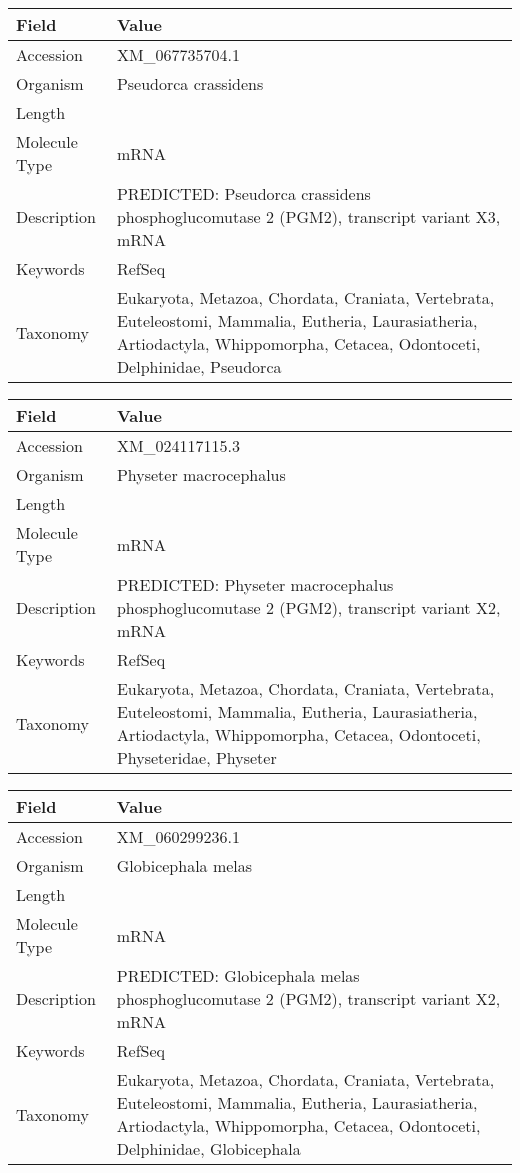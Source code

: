 \documentclass[10pt]{article}
\begin{document}
{\footnotesize
\begin{longtable}{>{\raggedright\arraybackslash}p{4.5cm} >{\raggedright\arraybackslash}p{11.5cm}}
\textbf{Field} & \textbf{Value} \\
\hline
Accession & XM\_067735704.1 \\
Organism & Pseudorca crassidens \\
Length & 12477 \\
Molecule Type & mRNA \\
Description & PREDICTED: Pseudorca crassidens phosphoglucomutase 2 (PGM2), transcript variant X3, mRNA \\
Keywords & RefSeq \\
Taxonomy & Eukaryota, Metazoa, Chordata, Craniata, Vertebrata, Euteleostomi, Mammalia, Eutheria, Laurasiatheria, Artiodactyla, Whippomorpha, Cetacea, Odontoceti, Delphinidae, Pseudorca \\
\end{longtable}
}

{\footnotesize
\begin{longtable}{>{\raggedright\arraybackslash}p{4.5cm} >{\raggedright\arraybackslash}p{11.5cm}}
\textbf{Field} & \textbf{Value} \\
\hline
Accession & XM\_024117115.3 \\
Organism & Physeter macrocephalus \\
Length & 2024 \\
Molecule Type & mRNA \\
Description & PREDICTED: Physeter macrocephalus phosphoglucomutase 2 (PGM2), transcript variant X2, mRNA \\
Keywords & RefSeq \\
Taxonomy & Eukaryota, Metazoa, Chordata, Craniata, Vertebrata, Euteleostomi, Mammalia, Eutheria, Laurasiatheria, Artiodactyla, Whippomorpha, Cetacea, Odontoceti, Physeteridae, Physeter \\
\end{longtable}
}

{\footnotesize
\begin{longtable}{>{\raggedright\arraybackslash}p{4.5cm} >{\raggedright\arraybackslash}p{11.5cm}}
\textbf{Field} & \textbf{Value} \\
\hline
Accession & XM\_060299236.1 \\
Organism & Globicephala melas \\
Length & 6897 \\
Molecule Type & mRNA \\
Description & PREDICTED: Globicephala melas phosphoglucomutase 2 (PGM2), transcript variant X2, mRNA \\
Keywords & RefSeq \\
Taxonomy & Eukaryota, Metazoa, Chordata, Craniata, Vertebrata, Euteleostomi, Mammalia, Eutheria, Laurasiatheria, Artiodactyla, Whippomorpha, Cetacea, Odontoceti, Delphinidae, Globicephala \\
\end{longtable}
}
\end{document}
